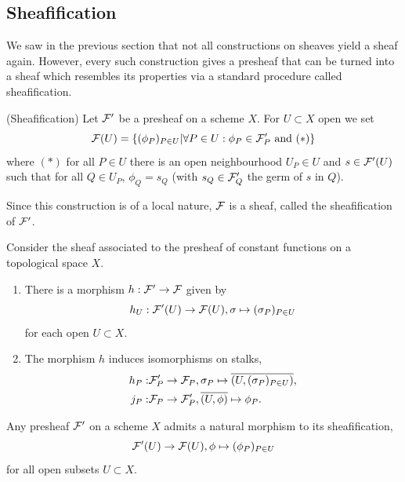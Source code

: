\documentclass[a4paper,11pt]{article}
\begin{document}
		
		\subsection{Sheafification}

			We saw in the previous section that not all constructions on sheaves yield a sheaf again. However, every such construction gives a presheaf that can be turned into a sheaf which resembles its properties  via a standard procedure called sheafification.

			\begin{defi}
				(Sheafification) Let $\mathcal{F}^\prime$ be a presheaf on a scheme $X$. For $U\subset X$ open we set
				\begin{equation*}
					\mathcal{F}(U)=\{(\phi_P)_{P\in U}|\forall P\in U:\phi_P\in\mathcal{F}^\prime_P\text{ and }(\ast)\}
				\end{equation*}
				where $(\ast)$ for all $P\in U$ there is an open neighbourhood $U_P\in U$ and $s\in\mathcal{F}^\prime(U)$ such that for all $Q\in U_P$, $\phi_Q=s_Q$ (with $s_Q\in\mathcal{F}^\prime_Q$ the germ of $s$ in $Q$). 
			\end{defi}

			Since this construction is of a local nature, $\mathcal{F}$ is a sheaf, called the sheafification of $\mathcal{F}^\prime$.
			
			\begin{eg}
				Consider the sheaf associated to the presheaf of constant functions on a topological space $X$.
				\begin{enumerate}
					\item There is a morphism $h:\mathcal{F}^\prime\rightarrow\mathcal{F}$ given by
						\begin{equation*}
							h_U:\mathcal{F}^\prime(U)\rightarrow\mathcal{F}(U),\sigma\mapsto(\sigma_P)_{P\in U}
						\end{equation*}
						for each open $U\subset X$.
					\item The morphism $h$ induces isomorphisms on stalks,
						\begin{align*}
							h_P:&\mathcal{F}^\prime_P\rightarrow\mathcal{F}_P,\sigma_P\mapsto\overline{(U,(\sigma_P)_{P\in U})},\\
							j_P:&\mathcal{F}_P\rightarrow\mathcal{F}^\prime_P,\overline{(U,\phi)}\mapsto\phi_P.
						\end{align*}
				\end{enumerate}
			\end{eg}

			\begin{remark}
				Any presheaf $\mathcal{F}^\prime$ on a scheme $X$ admits a natural morphism to its sheafification,
				\begin{equation*}
					\mathcal{F}^\prime(U)\rightarrow\mathcal{F}(U),\phi\mapsto(\phi_P)_{P\in U}
				\end{equation*}
				for all open subsets $U\subset X$.
			\end{remark}
			
\end{document}
